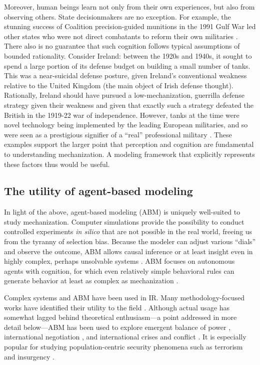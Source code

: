 \documentclass{article}
\begin{document}
Moreover, human beings learn not only from their own experiences, but also from observing others.
State decisionmakers are no exception. For example, the stunning success of
Coalition precision-guided munitions in the 1991 Gulf War led other states who
were not direct combatants to reform their own militaries
\citep{scobell2011chinese}. There also is no guarantee that such cognition
follows typical assumptions of bounded rationality. 
Consider Ireland: between the 1920s and 1940s, it sought to spend a
large portion of its defense budget on building a small number of
tanks. This was a near-suicidal defense posture, given Ireland's
conventional weakness relative to the United Kingdom (the main object of Irish
defense thought). Rationally, Ireland should have pursued a low-mechanization,
guerrilla defense strategy given their weakness and given that exactly such a
strategy defeated the British in the 1919-22 war of independence. However,  
tanks at the time were novel technology being implemented by the leading
European militaries, and so were seen as a prestigious signifier of a ``real'' professional
military \citep{farrell1998professionalization,farrell2001transnational}. These examples
support the larger point that perception and cognition are fundamental to
understanding mechanization. A modeling framework that explicitly represents these factors
thus would be useful.

\subsection{The utility of agent-based modeling}

In light of the above, agent-based modeling (ABM) is 
uniquely well-suited to study mechanization. Computer simulations provide the possibility 
to conduct controlled experiments \textit{in silico} \citep{epstein1996growing} that are not possible 
in the real world, freeing us from the tyranny of selection bias. Because the
modeler can adjust various ``dials'' and observe the outcome, ABM allows causal
inference or at least insight even in highly complex, perhaps unsolvable systems
\citep[c.f.][]{axtell2000agents}. ABM focuses on autonomous agents with
cognition, for which even relatively simple behavioral rules can generate
behavior at least as complex as mechanization
\citep{gilbert2005simulation}.

Complex systems and ABM have been used in IR. Many methodology-focused
works have identified their utility to the field \citep[some prominent examples
are][]{modelski1990world,jervis1998system,pepinsky2005agents,de2014agent}.
Although actual usage has somewhat lagged behind theoretical
enthusiasm---a point addressed in more detail below---ABM has been used to explore emergent 
balance of power \citep{cederman1997emergent}, international negotiation
\citep{earnest2008coordination}, and international crises and conflict
\citep{masad2016dissertation}. It is especially popular for studying
population-centric security phenomena such as terrorism and insurgency
\citep{cioffi2010mason,bhavnani2012modeling,weidmann2013violence,bhavnani2014group}.
\end{document}
